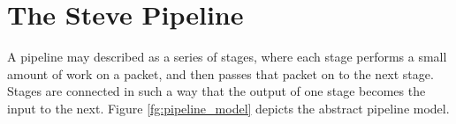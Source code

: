 %
%
%
%

\section{The Steve Pipeline} \label{pipeline_desc}


A pipeline may described as a series of stages, where each stage performs
a small amount of work on a packet, and then passes that packet on to the
next stage.
Stages are connected in such a way that the output of
one stage becomes the input to the next. 
Figure \ref{fg:pipeline_model} depicts the abstract pipeline model.

